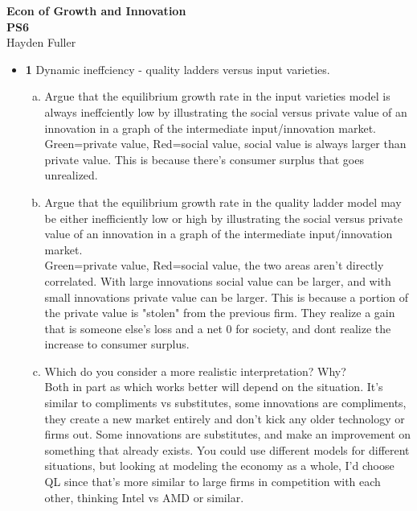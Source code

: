 \documentclass[11pt]{article}
\begin{document}
\thispagestyle{empty}   %

\begin{center}
\large
\textbf{Econ of Growth and Innovation \\
PS6}
\\Hayden Fuller
\end{center}

\begin{itemize}

\item \textbf{1} 
Dynamic ineffciency - quality ladders versus input varieties.
\begin{enumerate}[(a)]
\item Argue that the equilibrium growth rate in the input varieties model is always ineffciently low by illustrating the social versus private value of an innovation in a graph of the intermediate input/innovation market.
\vspace{2in}
\\Green=private value, Red=social value, social value is always larger than private value. This is because there's consumer surplus that goes unrealized.
\item Argue that the equilibrium growth rate in the quality ladder model may be either inefficiently low or high by illustrating the social versus private value of an innovation in a graph of the intermediate input/innovation market.
\vspace{2in}
\\Green=private value, Red=social value, the two areas aren't directly correlated. With large innovations social value can be larger, and with small innovations private value can be larger. This is because a portion of the private value is "stolen" from the previous firm. They realize a gain that is someone else's loss and a net 0 for society, and dont realize the increase to consumer surplus.
\item Which do you consider a more realistic interpretation? Why?
\\Both in part as which works better will depend on the situation. It's similar to compliments vs substitutes, some innovations are compliments, they create a new market entirely and don't kick any older technology or firms out. Some innovations are substitutes, and make an improvement on something that already exists. You could use different models for different situations, but looking at modeling the economy as a whole, I'd choose QL since that's more similar to large firms in competition with each other, thinking Intel vs AMD or similar.
\end{enumerate}


\end{itemize}
\end{document}
